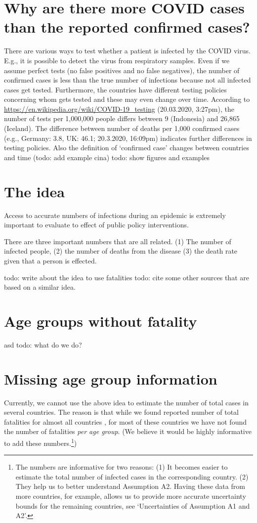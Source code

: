 \documentclass[a4paper]{article}
\newcommand\todo[1]{{\color{red}todo: #1}}
\begin{document}
\section{Why are there more COVID cases 
than the reported confirmed cases?}
There are various ways to test whether a patient is infected by the
COVID virus. E.g., it is possible to detect the virus from respiratory
samples.  Even if we assume perfect tests (no false positives and no
false negatives), the number of confirmed cases is less than the true
number of infections because not all infected cases get tested.
Furthermore, the countries have different testing policies concerning
whom gets tested and these may even change over time.  According to
\url{https://en.wikipedia.org/wiki/COVID-19_testing} (20.03.2020,
3:27pm), the number of tests per 1,000,000 people differs between 9
(Indonesia) and 26,865 (Iceland).  The difference between number of
deaths per 1,000 confirmed cases (e.g., Germany: 3.8, UK: 46.1;
20.3.2020, 16:09pm) indicates further differences in testing policies.
Also the definition of `confirmed case' changes between countries and
time (\todo{add example cina}) \todo{show figures and examples}

\section{The idea}

Access to accurate numbers of infections during an epidemic is
extremely important to evaluate to effect of public policy
interventions.

There are three important numbers that are all related. (1) The number
of infected people, (2) the number of deaths from the disease (3) the
death rate given that a person is effected.


\todo{write about the idea to use fatalities}
\todo{cite some other sources that are based on a similar idea.}


\section{Age groups without fatality}
asd 
\todo{what do we do?}


\section{Missing age group information}
Currently, we cannot use the above idea to 
estimate the number of total cases in 
several countries. The reason is that 
while we found reported number of total fatalities 
for almost all countries \citep[e.g.][]{JohnHopkins},
for most of these countries we have not found the number of fatalities \emph{per age group}. 
(We believe it would be highly informative to add these numbers.\footnote{The numbers 
are informative for two reasons: (1) It
becomes easier to estimate the 
total number of infected cases in the 
corresponding country.
(2) They help us to better understand Assumption A2. Having these data from 
more countries, for example, 
allows us to 
provide more accurate uncertainty bounds for 
the remaining countries, see `Uncertainties of Assumption A1 and A2'.})
\end{document}

